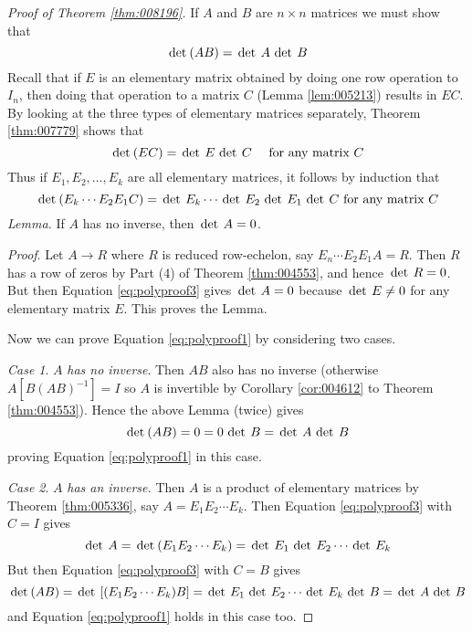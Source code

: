 \begin{proof}[Proof of Theorem \ref{thm:008196}]
If $A$ and $B$ are $n \times n$ matrices we must show that
\begin{equation}\label{eq:polyproof1}
\thinspace\operatorname{det\medspace} (AB) = \thinspace\operatorname{det \medspace} A \thinspace\operatorname{det \medspace} B
\end{equation}
Recall that if $E$ is an elementary matrix obtained by doing one row operation to $I_{n}$, then doing that operation to a matrix $C$ (Lemma \ref{lem:005213}) results in $EC$. By looking at the three types of elementary matrices separately, Theorem \ref{thm:007779} shows that
\begin{equation}\label{eq:polyproof2}
\thinspace\operatorname{det\medspace} (EC) = \thinspace\operatorname{det \medspace} E \thinspace\operatorname{det \medspace} C \quad \mbox{ for any matrix } C
\end{equation}
Thus if $E_{1}, E_{2}, \dots, E_{k}$ are all elementary matrices, it follows by induction that
\begin{equation}\label{eq:polyproof3}
\thinspace\operatorname{det\medspace} (E_k \cdots E_2E_1C) = \thinspace\operatorname{det \medspace} E_k \cdots \thinspace\operatorname{det \medspace} E_2 \thinspace\operatorname{det \medspace} E_1 \thinspace\operatorname{det \medspace} C \mbox{ for any matrix } C
\end{equation}
\textit{Lemma.} If $A$ has no inverse, then $\thinspace\operatorname{det \medspace} A = 0$.


\textit{Proof}. Let $A \to R$ where $R$ is reduced row-echelon, say $E_{n} \cdots E_{2}E_{1}A = R$. Then $R$ has a row of zeros by Part (4) of Theorem \ref{thm:004553},  and hence $\thinspace\operatorname{det \medspace} R = 0$. But then Equation \ref{eq:polyproof3} gives $\thinspace\operatorname{det \medspace}A = 0$ because $\thinspace\operatorname{det \medspace} E \neq 0$ for any elementary matrix $E$. This proves the Lemma.


Now we can prove Equation \ref{eq:polyproof1} by considering two cases.


\noindent \textit{Case 1}. $A$ \textit{has no inverse}. Then $AB$ also has no inverse (otherwise $A[B(AB)^{-1}] = I$ so $A$ is invertible by Corollary \ref{cor:004612} to Theorem \ref{thm:004553}). Hence the above Lemma (twice) gives
\begin{equation*}
\thinspace\operatorname{det\medspace} (AB) = 0 = 0 \thinspace\operatorname{det \medspace} B = \thinspace\operatorname{det \medspace} A \thinspace\operatorname{det \medspace} B
\end{equation*}
proving Equation \ref{eq:polyproof1} in this case.


\noindent \textit{Case 2}. $A$ \textit{has an inverse.} Then $A$ is a product of elementary matrices by Theorem \ref{thm:005336}, say $A = E_{1}E_{2}\cdots E_{k}$. Then Equation \ref{eq:polyproof3} with $C = I$ gives
\begin{equation*}
\thinspace\operatorname{det \medspace} A = \thinspace\operatorname{det\medspace} (E_1E_2\cdots E_k)= \thinspace\operatorname{det \medspace} E_1 \thinspace\operatorname{det \medspace} E_2 \cdots \thinspace\operatorname{det \medspace} E_k
\end{equation*}
But then Equation \ref{eq:polyproof3} with $C = B$ gives
\begin{equation*}
\thinspace\operatorname{det\medspace}(AB) = \thinspace\operatorname{det\medspace} \left[(E_1E_2\cdots E_k)B \right]= \thinspace\operatorname{det \medspace} E_1 \thinspace\operatorname{det \medspace} E_2 \cdots \thinspace\operatorname{det \medspace} E_k \thinspace\operatorname{det \medspace} B = \thinspace\operatorname{det \medspace} A \thinspace\operatorname{det \medspace} B
\end{equation*}
and Equation \ref{eq:polyproof1} holds in this case too.
\end{proof}



